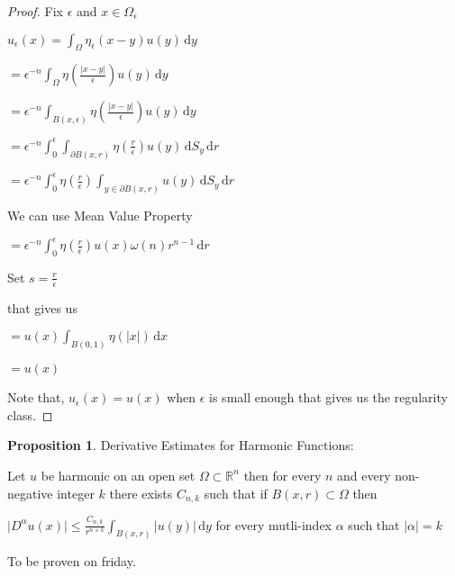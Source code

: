 \documentclass{article}
\theoremstyle{definition}
\newtheorem{proposition}{Proposition}
\begin{document}
\begin{proof}
    Fix \(\epsilon\) and \(x\in \Omega_{\epsilon} \) 

    \(\displaystyle u_{\epsilon} (x)=\int_{\Omega}^{} \eta _\epsilon (x-y)u(y) \,\mathrm{d}y \) 

    \(\displaystyle =\epsilon^{-n}\int_{\Omega}^{} \eta \left( \frac{\vert x-y \vert }{\epsilon} \right) u(y) \,\mathrm{d}y \) 

    \(\displaystyle = \epsilon ^{-n} \int_{B(x,\epsilon)}^{} \eta \left( \frac{\vert x-y \vert }{\epsilon} \right) u(y) \,\mathrm{d}y  \) 

    \(\displaystyle = \epsilon ^{-n} \int_{0}^{\epsilon} \int_{\partial B(x,r)}^{} \eta \left( \frac{r}{\epsilon} \right) u(y) \,\mathrm{d}S_y  \,\mathrm{d}r \) 

    \(\displaystyle = \epsilon ^{-n} \int_{0}^{\epsilon} \eta \left( \frac{r}{\epsilon} \right)   \int_{y\in \partial B(x,r)}^{} u(y) \,\mathrm{d}S_y \,\mathrm{d}r \) 

    We can use Mean Value Property

    \(\displaystyle = \epsilon ^{-n} \int_{0}^{\epsilon} \eta \left( \frac{r}{\epsilon} \right)   u(x)\omega(n)r^{n-1} \,\mathrm{d}r \) 


    Set \(s=\frac{r}{\epsilon}\) 
    
    that gives us
    
    \(\displaystyle = u(x) \int_{B(0,1)}^{} \eta (\vert x \vert ) \,\mathrm{d}x \) 

    \(=u(x)\) 

    Note that, \(u_{\epsilon}(x)=u(x) \) when \(\epsilon \) is small enough that gives us the regularity class. 

\end{proof}

\begin{proposition}
    Derivative Estimates for Harmonic Functions:

    Let \(u\) be harmonic on an open set \(\Omega \subset \mathbb{R} ^n\) then for every \(n\) and every non-negative integer \(k\) there exists \(C_{n,k}\) such that if \(B(x,r) \subset \Omega\) then

    \(\displaystyle \vert D^\alpha u(x) \vert \leq \frac{C_{n,k}}{r^{n+k} } \int_{B(x,r)}^{} \vert u(y) \vert  \,\mathrm{d}y \) for every mutli-index \(\alpha \) such that \(\vert \alpha  \vert = k\) 

\end{proposition}

To be proven on friday.
\end{document}
